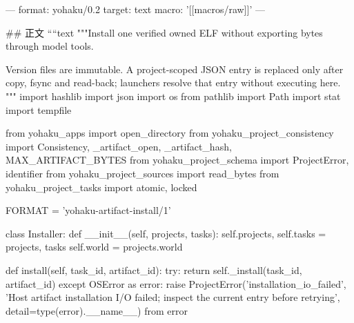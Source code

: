 ---
format: yohaku/0.2
target: text
macro: '[[macros/raw]]'
---

## 正文
````text
"""Install one verified owned ELF without exporting bytes through model tools.

Version files are immutable. A project-scoped JSON entry is replaced only after
copy, fsync and read-back; launchers resolve that entry without executing here.
"""
import hashlib
import json
import os
from pathlib import Path
import stat
import tempfile

from yohaku_apps import open_directory
from yohaku_project_consistency import Consistency, _artifact_open, _artifact_hash, MAX_ARTIFACT_BYTES
from yohaku_project_schema import ProjectError, identifier
from yohaku_project_sources import read_bytes
from yohaku_project_tasks import atomic, locked

FORMAT = 'yohaku-artifact-install/1'


class Installer:
    def __init__(self, projects, tasks):
        self.projects, self.tasks = projects, tasks
        self.world = projects.world

    def install(self, task_id, artifact_id):
        try:
            return self._install(task_id, artifact_id)
        except OSError as error:
            raise ProjectError('installation_io_failed', 'Host artifact installation I/O failed; inspect the current entry before retrying', detail=type(error).__name__) from error

